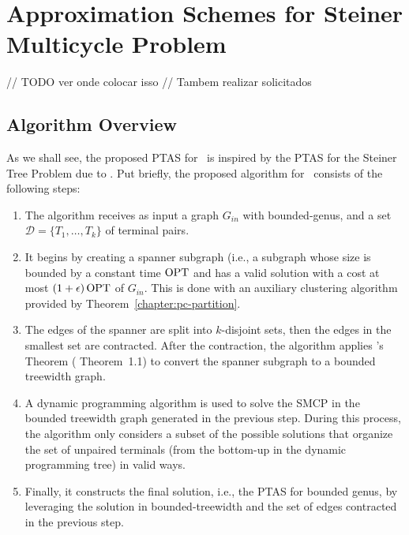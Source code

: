 \chapter{Approximation Schemes for Steiner Multicycle Problem}
\label{chapter:apx_schemes_for_smcp}

// TODO ver onde colocar isso
// Tambem realizar solicitados

\section{Algorithm Overview}

As we shall see, the proposed PTAS for \steinercycle\ is inspired by the PTAS for the Steiner Tree Problem due to \cite{Bateni}. Put briefly, the proposed algorithm for \steinercycle\ consists of the following steps:

\begin{enumerate}
    \item The algorithm receives as input a graph \(G_{in}\) with bounded-genus, and a set \(\mathcal{D} = \{T_1, \dots, T_k\}\) of terminal pairs.

    \item It begins by creating a spanner subgraph (i.e., a subgraph whose size is bounded by a constant time \(\operatorname{\textrm{OPT}}\) and has a valid solution with a cost at most \((1 + \epsilon) \operatorname{\textrm{OPT}}\) of \(G_{in}\). This is done with an auxiliary clustering algorithm provided by Theorem~\ref{chapter:pc-partition}.
    
    \item The edges of the spanner are split into \(k\)-disjoint sets, then the edges in the smallest set are contracted. After the contraction, the algorithm applies \citeauthor{Demaine2010}'s Theorem (\cite{Demaine2010} Theorem~1.1) to convert the spanner subgraph to a bounded treewidth graph.

    \item A dynamic programming algorithm is used to solve the SMCP in the bounded treewidth graph generated in the previous step. During this process, the algorithm only considers a subset of the possible solutions that organize the set of unpaired terminals (from the bottom-up in the dynamic programming tree) in valid ways.

    \item Finally, it constructs the final solution, i.e., the PTAS for bounded genus, by leveraging the solution in bounded-treewidth and the set of edges contracted in the previous step.
\end{enumerate}

